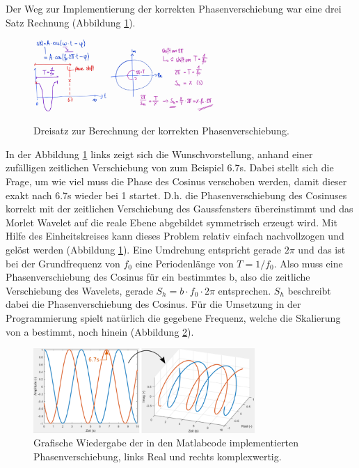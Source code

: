 Der Weg zur Implementierung der korrekten Phasenverschiebung war eine drei Satz Rechnung (Abbildung \ref{wavelet:fig:PhaseCalc}).
\begin{figure}
	\centering
	\includegraphics[width=0.25\textwidth]{papers/wavelets/images/10-1_PhaseCalc1.png}
	\includegraphics[width=0.35\textwidth]{papers/wavelets/images/10-2_PhaseCalc2.png}
	\caption{Dreisatz zur Berechnung der korrekten Phasenverschiebung.}
	\label{wavelet:fig:PhaseCalc}
\end{figure}
In der Abbildung \ref{wavelet:fig:PhaseCalc} links zeigt sich die Wunschvorstellung, anhand einer zufälligen zeitlichen Verschiebung von zum Beispiel 6.7s. Dabei stellt sich die Frage, um wie viel muss die Phase des Cosinus verschoben werden, damit dieser exakt nach 6.7s wieder bei 1 startet. D.h. die Phasenverschiebung des Cosinuses korrekt mit der zeitlichen Verschiebung des Gaussfensters übereinstimmt und das Morlet Wavelet auf die reale Ebene abgebildet symmetrisch erzeugt wird.
Mit Hilfe des Einheitskreises kann dieses Problem relativ einfach nachvollzogen und gelöst werden (Abbildung \ref{wavelet:fig:PhaseCalc}). 
Eine Umdrehung entspricht gerade $2\pi$ und das ist bei der Grundfrequenz von $f_0$ eine Periodenlänge von $T=1/f_0$. Also muss eine Phasenverschiebung des Cosinus für ein bestimmtes b, also die zeitliche Verschiebung des Wavelets, gerade $S_h=b\cdot f_0\cdot 2\pi$ entsprechen. $S_h$ beschreibt dabei die Phasenverschiebung des Cosinus.
Für die Umsetzung in der Programmierung spielt natürlich die gegebene Frequenz, welche die Skalierung von a bestimmt, noch hinein (Abbildung \ref{wavelet:fig:PhaseShiftBsp}).

\begin{figure}
	\centering
	\includegraphics[width=0.75\textwidth]{papers/wavelets/images/10-3_PhaseShiftBsp.png}
	\caption{Grafische Wiedergabe der in den Matlabcode implementierten Phasenverschiebung, links Real und rechts komplexwertig.}
	\label{wavelet:fig:PhaseShiftBsp}
\end{figure}

